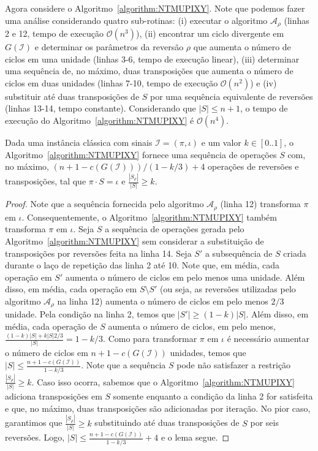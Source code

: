 Agora considere o Algoritmo~\ref{algorithm:NTMUPIXY}. Note que podemos fazer uma análise considerando quatro sub-rotinas: (i)  executar o algoritmo  $\mathcal{A}_\rho$ (linhas 2 e 12, tempo de execução $\mathcal{O}(n^3)$), (ii) encontrar um ciclo divergente em $G(\mathcal{I})$ e determinar os parâmetros da reversão $\rho$ que aumenta o número de ciclos em uma unidade (linhas 3-6, tempo de execução linear), (iii) determinar uma sequência de, no máximo, duas transposições que aumenta o número de ciclos em duas unidades (linhas 7-10, tempo de execução $\mathcal{O}(n^2)$) e (iv) substituir até duas transposições de $S$ por uma sequência equivalente de reversões (linhas 13-14, tempo constante). Considerando que $|S| \le {n + 1}$, o tempo de execução do Algoritmo~\ref{algorithm:NTMUPIXY} é $\mathcal{O}(n^4)$.



\begin{lemma}\label{lemma:THMUHLVK}
Dada uma instância clássica com sinais $\mathcal{I} = (\pi,\iota)$ e um valor $k \in [0..1]$, o Algoritmo~\ref{algorithm:NTMUPIXY} fornece uma sequência de operações $S$ com, no máximo, $(n+1-c(G(\mathcal{I}))) / (1-k/3) + 4$ operações de reversões e transposições, tal que $\pi \cdot S = \iota$ e $\frac{|S_{\rho}|}{|S|} \ge k$. 
\end{lemma}
\begin{proof}
Note que a sequência fornecida pelo algoritmo $\mathcal{A}_\rho$ (linha 12) transforma $\pi$ em $\iota$. Consequentemente, o Algoritmo~\ref{algorithm:NTMUPIXY} também transforma $\pi$ em $\iota$.
Seja $S$ a sequência de operações gerada pelo Algoritmo~\ref{algorithm:NTMUPIXY} sem considerar a substituição de transposições por reversões feita na linha 14. Seja $S'$ a subsequência de $S$ criada durante o laço de repetição das linha 2 até 10. Note que, em média, cada operação em $S'$ aumenta o número de ciclos em pelo menos uma unidade. Além disso, em média, cada operação em $S \setminus S'$ (ou seja, as reversões utilizadas pelo algoritmo $\mathcal{A}_\rho$ na linha 12) aumenta o número de ciclos em pelo menos $2/3$ unidade. Pela condição na linha 2, temos que $|S'| \ge (1-k) |S|$. Além disso, em média, cada operação de $S$ aumenta o número de ciclos, em pelo menos, $\frac{(1-k)|S| + k|S|2/3}{|S|} = 1 - k/3$. Como para transformar $\pi$ em $\iota$ é necessário aumentar o número de ciclos em $n+1-c(G(\mathcal{I}))$ unidades, temos que $|S| \le \frac{n+1-c(G(\mathcal{I}))}{1-k/3}$. Note que a sequência $S$ pode não satisfazer a restrição $\frac{|S_{\rho}|}{|S|} \ge k$. Caso isso ocorra, sabemos que o Algoritmo~\ref{algorithm:NTMUPIXY} adiciona transposições em $S$ somente enquanto a condição da linha 2 for satisfeita e que, no máximo, duas transposições são adicionadas por iteração. No pior caso, garantimos que $\frac{|S_{\rho}|}{|S|} \ge k$ substituindo até duas transposições de $S$ por seis reversões. Logo, $|S| \le \frac{n+1-c(G(\mathcal{I}))}{1-k/3} + 4$ e o lema segue.
\end{proof}

